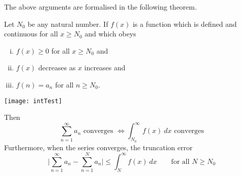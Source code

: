 The above arguments are formalised in the following theorem.
\begin{theorem}\label{thm:SRintegralTest}
Let $N_0$ be any natural number. If $f(x)$ is a function which is defined
and continuous for all $x\ge N_0$ and which obeys
\begin{enumerate}[(i)]\itemsep1pt \parskip0pt  %
\item $f(x)\ge 0$ for all $x\ge N_0$ and
\item $f(x)$ decreases as $x$ increases and
\item $f(n)=a_n$ for all  $n\ge N_0$.
\end{enumerate}
\begin{center}
   \texttt{[image: intTest]}
\end{center}
Then
\begin{equation*}
\sum_{n=1}^\infty a_n\text{ converges }\iff
\int_{N_0}^\infty f(x)\ dx\text{ converges}
\end{equation*}
Furthermore, when the series converges, the truncation error
\begin{equation*}
\bigg|\sum_{n=1}^\infty a_n-\sum_{n=1}^N a_n\bigg|\le
  \int_N^\infty f(x)\ dx\qquad\text{for all $N\ge N_0$}
\end{equation*}
\end{theorem}


